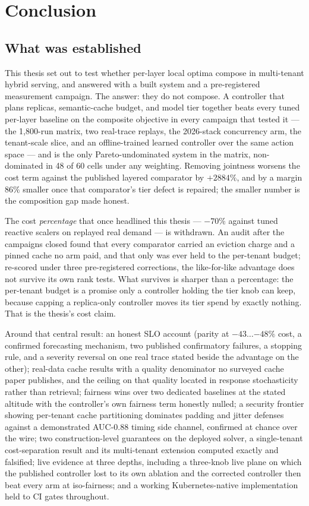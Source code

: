\chapter{Conclusion}
\label{ch:conclusion}

\section{What was established}

This thesis set out to test whether per-layer local optima compose in
multi-tenant hybrid serving, and answered with a built system and a
pre-registered measurement campaign. The answer: they do not compose. A
controller that plans replicas, semantic-cache budget, and model tier
together beats every tuned per-layer baseline on the composite objective in
every campaign that tested it --- the 1{,}800-run matrix, two real-trace
replays, the 2026-stack concurrency arm, the tenant-scale slice, and an
offline-trained learned controller over the same action space --- and is
the only Pareto-undominated system in the matrix, non-dominated in 48 of
60 cells under any weighting. Removing jointness worsens the cost term
against the published layered comparator by $+2884\%$, and by a margin
$86\%$ smaller once that comparator's tier defect is repaired; the smaller
number is the composition gap made honest.

The cost \emph{percentage} that once headlined this thesis --- $-70\%$
against tuned reactive scalers on replayed real demand --- is withdrawn.
An audit after the campaigns closed found that every comparator carried an
eviction charge and a pinned cache no \jcac{} arm paid, and that only
\jcac{} was ever held to the per-tenant budget; re-scored under three
pre-registered corrections, the like-for-like advantage does not survive
its own rank tests. What survives is sharper than a percentage: the
per-tenant budget is a promise only a controller holding the tier knob can
keep, because capping a replica-only controller moves its tier spend by
exactly nothing. That is the thesis's cost claim.

Around that central result: an honest SLO account (parity at
$-43\ldots{-48\%}$ cost, a confirmed forecasting mechanism, two published
confirmatory failures, a stopping rule, and a severity reversal on one real
trace stated beside the advantage on the other); real-data cache results
with a quality denominator no surveyed cache paper publishes, and the
ceiling on that quality located in response stochasticity rather than
retrieval; fairness wins over two dedicated baselines at the stated
altitude with the controller's own fairness term honestly nulled; a
security frontier showing per-tenant cache partitioning dominates padding
and jitter defenses against a demonstrated AUC-0.88 timing side channel,
confirmed at chance over the wire; two construction-level guarantees on the
deployed solver, a single-tenant cost-separation result and its
multi-tenant extension computed exactly and falsified; live evidence at
three depths, including a three-knob live plane on which the published
controller lost to its own ablation and the corrected controller then beat
every arm at iso-fairness; and a working Kubernetes-native implementation
held to CI gates throughout.

